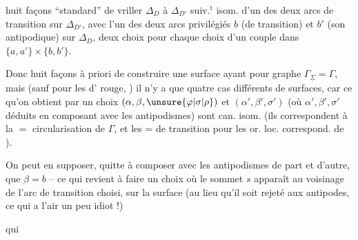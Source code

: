 huit façons ``standard'' de vriller $\Delta_D$ à $\Delta_{D'}$ suiv.$^{\mathrm t}$   isom.  d'un des deux arcs de transition  sur $\Delta_{D'}$, avec l'un des deux arcs privilégiés $b$ (de transition) et $b'$ (son antipodique) sur $\Delta_D$, deux choix pour chaque choix d'un couple dans $\{a,a'\}\times\{b,b'\}$.

Donc huit façons à priori de construire une surface  ayant pour graphe $\Gamma_{\underline\Sigma}=\Gamma$, mais (sauf pour les  d' rouge, ) il n'y a que quatre cas différents de surfaces, car ce qu'on obtient par un choix $(\alpha,\beta,\unsure{\varphi|\sigma|\rho})$ et $(\alpha',\beta',\sigma')$ (où $\alpha',\beta',\sigma'$ déduits en composant avec les antipodismes) sont can. isom. (ils correspondent à la \ensuremath{=} circularisation de $\Gamma$, et les $\mathord{=}$  de transition pour les or. loc. correspond. de ).

On peut en supposer, quitte à composer avec les antipodismes de part et d'autre, que $\beta=b$ -- ce qui revient à faire un choix où le sommet $s$ apparaît  au voisinage de l'arc de transition choisi, sur la surface  (au lieu qu'il soit rejeté aux antipodes, ce qui a l'air un peu idiot !)

 qui
